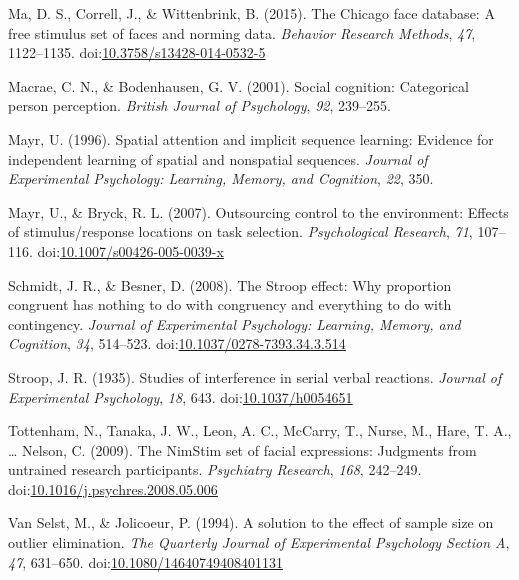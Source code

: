 \documentclass[english,,man,floatsintext]{apa6}
\begin{document}
\hypertarget{ref-ma_chicago_2015}{}
Ma, D. S., Correll, J., \& Wittenbrink, B. (2015). The Chicago face
database: A free stimulus set of faces and norming data. \emph{Behavior
Research Methods}, \emph{47}, 1122--1135.
doi:\href{https://doi.org/10.3758/s13428-014-0532-5}{10.3758/s13428-014-0532-5}

\hypertarget{ref-macrae_social_2001}{}
Macrae, C. N., \& Bodenhausen, G. V. (2001). Social cognition:
Categorical person perception. \emph{British Journal of Psychology},
\emph{92}, 239--255.

\hypertarget{ref-mayr_spatial_1996}{}
Mayr, U. (1996). Spatial attention and implicit sequence learning:
Evidence for independent learning of spatial and nonspatial sequences.
\emph{Journal of Experimental Psychology: Learning, Memory, and
Cognition}, \emph{22}, 350.

\hypertarget{ref-mayr_outsourcing_2007}{}
Mayr, U., \& Bryck, R. L. (2007). Outsourcing control to the
environment: Effects of stimulus/response locations on task selection.
\emph{Psychological Research}, \emph{71}, 107--116.
doi:\href{https://doi.org/10.1007/s00426-005-0039-x}{10.1007/s00426-005-0039-x}

\hypertarget{ref-schmidt_stroop_2008}{}
Schmidt, J. R., \& Besner, D. (2008). The Stroop effect: Why proportion
congruent has nothing to do with congruency and everything to do with
contingency. \emph{Journal of Experimental Psychology: Learning, Memory,
and Cognition}, \emph{34}, 514--523.
doi:\href{https://doi.org/10.1037/0278-7393.34.3.514}{10.1037/0278-7393.34.3.514}

\hypertarget{ref-stroop_studies_1935}{}
Stroop, J. R. (1935). Studies of interference in serial verbal
reactions. \emph{Journal of Experimental Psychology}, \emph{18}, 643.
doi:\href{https://doi.org/10.1037/h0054651}{10.1037/h0054651}

\hypertarget{ref-tottenham_nimstim_2009}{}
Tottenham, N., Tanaka, J. W., Leon, A. C., McCarry, T., Nurse, M., Hare,
T. A., \ldots{} Nelson, C. (2009). The NimStim set of facial
expressions: Judgments from untrained research participants.
\emph{Psychiatry Research}, \emph{168}, 242--249.
doi:\href{https://doi.org/10.1016/j.psychres.2008.05.006}{10.1016/j.psychres.2008.05.006}

\hypertarget{ref-van_selst_solution_1994}{}
Van Selst, M., \& Jolicoeur, P. (1994). A solution to the effect of
sample size on outlier elimination. \emph{The Quarterly Journal of
Experimental Psychology Section A}, \emph{47}, 631--650.
doi:\href{https://doi.org/10.1080/14640749408401131}{10.1080/14640749408401131}
\end{document}
